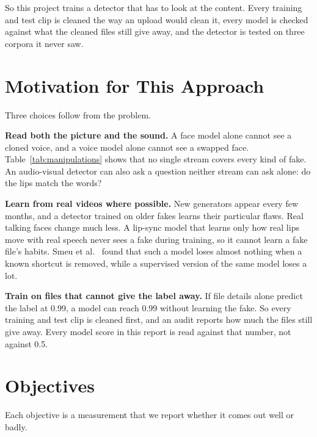 So this project trains a detector that has to look at the content. Every
training and test clip is cleaned the way an upload would clean it, every model
is checked against what the cleaned files still give away, and the detector is
tested on three corpora it never saw.

\section{Motivation for This Approach}

Three choices follow from the problem.

\textbf{Read both the picture and the sound.} A face model alone cannot see a
cloned voice, and a voice model alone cannot see a swapped face.
Table~\ref{tab:manipulations} shows that no single stream covers every kind of
fake. An audio-visual detector can also ask a question neither stream can ask
alone: do the lips match the words?

\textbf{Learn from real videos where possible.} New generators appear every few
months, and a detector trained on older fakes learns their particular flaws.
Real talking faces change much less. A lip-sync model that learns only how real
lips move with real speech never sees a fake during training, so it cannot
learn a fake file's habits. Smeu et al.~\cite{smeu2025} found that such a
model loses almost nothing when a known shortcut is removed, while a
supervised version of the same model loses a lot.

\textbf{Train on files that cannot give the label away.} If file details alone
predict the label at 0.99, a model can reach 0.99 without learning the fake.
So every training and test clip is cleaned first, and an audit reports how
much the files still give away. Every model score in this report is read
against that number, not against 0.5.

\section{Objectives}

Each objective is a measurement that we report whether it comes out well or
badly.

